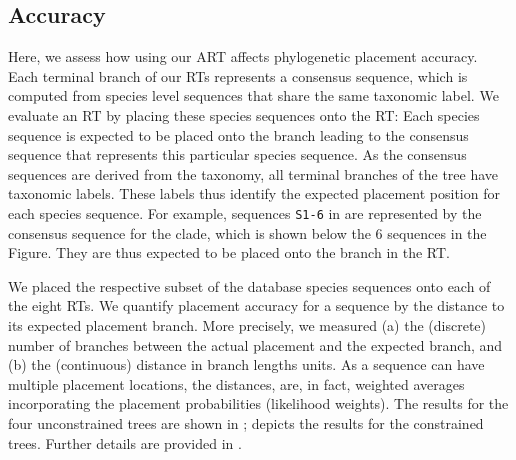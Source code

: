 \subsection{Accuracy}
\label{sec:Results:sub:Accuracy}

Here, we assess how using our \ac{ART} affects phylogenetic placement accuracy.
Each terminal branch of our \acp{RT} represents a consensus sequence,
which is computed from species level sequences %
that share the same taxonomic label.
We evaluate an \ac{RT} by placing these species sequences onto the \ac{RT}:
Each species sequence is expected to be placed onto the branch
leading to the consensus sequence that represents this particular species sequence.
As the consensus sequences are derived from the taxonomy, all terminal branches of the tree have taxonomic labels.
These labels thus identify the expected placement position for each species sequence.
For example, sequences \texttt{S1-6} in 
are represented by the consensus sequence for the  clade,
which is shown below the \num{6} sequences in the Figure.
They are thus expected to be placed onto the  branch in the \ac{RT}.


We placed the respective subset of the  database species sequences onto each of the eight \acp{RT}.
We quantify placement accuracy for a sequence by the distance to its expected placement branch.
More precisely, we measured (a) the (discrete) number of branches between the actual placement and the expected branch,
and (b) the (continuous) distance in branch lengths units.
As a sequence can have multiple placement locations, the distances, are, in fact, weighted averages incorporating
the placement probabilities (likelihood weights).
The results for the four unconstrained trees are shown in ;
 depicts the results for the constrained trees.
Further details are provided in .

